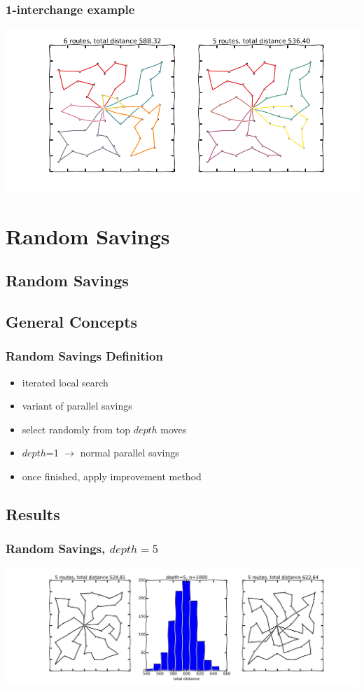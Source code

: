 \documentclass{beamer}
\begin{document}
\begin{frame}
\frametitle{1-interchange example}
\begin{center}
\includegraphics[scale=0.3]{figs/lambda}

\end{center}
\end{frame}

\section{Random Savings}


\subsection{Random Savings}

\subsection{General Concepts}
\begin{frame}
\frametitle{Random Savings Definition}
\begin{itemize}
	\item iterated local search
	\item variant of parallel savings
	\item select randomly from top $depth$ moves
	\item $depth$=1 $\rightarrow$ normal parallel savings
	\item once finished, apply improvement method
		
\end{itemize}
\end{frame}


\subsection{Results}
\begin{frame}
\frametitle{Random Savings, $depth=5$}
\begin{center}
\includegraphics[scale=0.25]{figs/random_savings5}

\end{center}
\end{frame}
\end{document}

